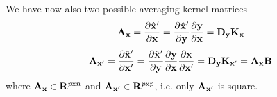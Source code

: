   We have now also two possible averaging kernel matrices
  \begin{equation}
    \mathbf{A}_{\mathbf{x}} 
      = \frac{\partial \hat{\mathbf{x}}'}{\partial \mathbf{x}} 
      = \frac{\partial \hat{\mathbf{x}}'}{\partial \mathbf{y}} \frac{\partial \mathbf{y}}{\partial \mathbf{x}}
      = \mathbf{D_y} \mathbf{K_x}
  \end{equation}
  \begin{equation}
    \mathbf{A}_{\mathbf{x}'} 
      = \frac{\partial \hat{\mathbf{x}}'}{\partial \mathbf{x}'} 
      = \frac{\partial\hat{\mathbf{x}}'}{\partial\mathbf{y}}\frac{\partial\mathbf{y}}{\partial\mathbf{x}}
      \frac{\partial\mathbf{x}}{\partial\mathbf{x}'}
      = \mathbf{D_y} \mathbf{K}_{\mathbf{x}'}
      = \mathbf{A}_{\mathbf{x}} \mathbf{B}
  \end{equation}
  where $\mathbf{A}_{\mathbf{x}} \in {\bf R}^{p {\mathrm x} n}$ and $\mathbf{A}_{\mathbf{x}'} \in
  {\bf R}^{p {\mathrm x} p}$, i.e. only $\mathbf{A}_{\mathbf{x}'}$ is square. 




